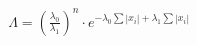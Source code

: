 \documentclass[preview]{standalone}
\begin{document}
\begin{align*}
\Lambda = \left(\frac{\lambda_0}{\lambda_1}\right)^n \cdot e^{-\lambda_0\sum |x_i| + \lambda_1\sum |x_i|}
\end{align*}
\end{document}
